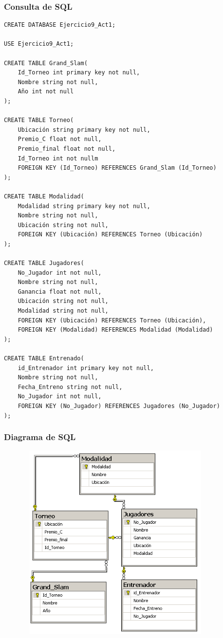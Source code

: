\documentclass[a4paper, 12pt]{article}
\begin{document}
\begin{justify}
        \subsubsection{Consulta de SQL}
\begin{verbatim}
CREATE DATABASE Ejercicio9_Act1;

USE Ejercicio9_Act1;

CREATE TABLE Grand_Slam(
    Id_Torneo int primary key not null,
    Nombre string not null,
    Año int not null
);

CREATE TABLE Torneo(
    Ubicación string primary key not null,
    Premio_C float not null,
    Premio_final float not null,
    Id_Torneo int not nullm
    FOREIGN KEY (Id_Torneo) REFERENCES Grand_Slam (Id_Torneo)
);

CREATE TABLE Modalidad(
    Modalidad string primary key not null,
    Nombre string not null,
    Ubicación string not null,
    FOREIGN KEY (Ubicación) REFERENCES Torneo (Ubicación)
);

CREATE TABLE Jugadores(
    No_Jugador int not null,
    Nombre string not null,
    Ganancia float not null,
    Ubicación string not null,
    Modalidad string not null,
    FOREIGN KEY (Ubicación) REFERENCES Torneo (Ubicación),
    FOREIGN KEY (Modalidad) REFERENCES Modalidad (Modalidad)
);

CREATE TABLE Entrenado(
    id_Entrenador int primary key not null,
    Nombre string not null,
    Fecha_Entreno string not null,
    No_Jugador int not null,
    FOREIGN KEY (No_Jugador) REFERENCES Jugadores (No_Jugador)
);
\end{verbatim}
        \subsubsection{Diagrama de SQL}
        \begin{figure}[H]
            \centering
            \includegraphics[width=10cm,height=10cm]{sql9.PNG}
        \end{figure}

\end{justify}
\end{document}
